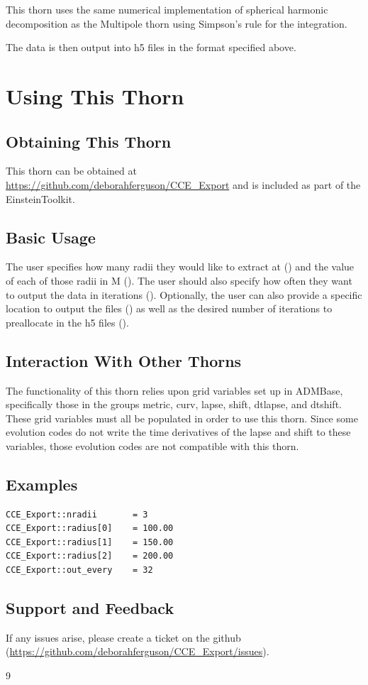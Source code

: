 \documentclass{article}
\begin{document}
This thorn uses the same numerical implementation of spherical harmonic decomposition as the Multipole thorn using 
Simpson’s rule for the integration.

The data is then output into h5 files in the format specified above.

\section{Using This Thorn}

\subsection{Obtaining This Thorn}

This thorn can be obtained at \url{https://github.com/deborahferguson/CCE_Export} and is included as part of the EinsteinToolkit.

\subsection{Basic Usage}

The user specifies how many radii they would like to extract at () and the value of each of those radii
in M (). The user should also specify how often they want to output the data in iterations ().
Optionally, the user can also provide a specific location to output the files () as well as the desired
number of iterations to preallocate in the h5 files ().

\subsection{Interaction With Other Thorns}

The functionality of this thorn relies upon grid variables set up in ADMBase, specifically those in the groups metric, curv, 
lapse, shift, dtlapse, and dtshift. These grid variables must all be populated in order to use this thorn. Since some 
evolution codes do not write the time derivatives of the lapse and shift to these variables, those evolution codes are not 
compatible with this thorn.

\subsection{Examples}

\begin{verbatim}
CCE_Export::nradii       = 3
CCE_Export::radius[0]    = 100.00
CCE_Export::radius[1]    = 150.00
CCE_Export::radius[2]    = 200.00
CCE_Export::out_every    = 32
\end{verbatim}

\subsection{Support and Feedback}

If any issues arise, please create a ticket on the github (\url{https://github.com/deborahferguson/CCE_Export/issues}).


\begin{thebibliography}{9}

\end{thebibliography}

\end{document}

